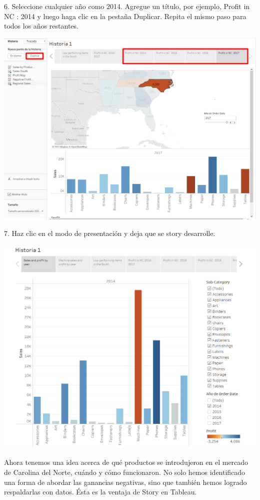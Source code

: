 \documentclass[12pt,letterpaper]{article}
\begin{document}
6. Seleccione cualquier año como 2014. Agregue un título, por ejemplo, Profit in NC :
2014 y luego haga clic en la pestaña Duplicar. Repita el mismo paso para todos los años
restantes.
\begin{center}
    \includegraphics[width=16cm]{img/70.png}  
\end{center}
7. Haz clic en el modo de presentación y deja que se story desarrolle.
\begin{center}
    \includegraphics[width=16cm]{img/71.png}  
\end{center}
Ahora tenemos una idea acerca de qué productos se introdujeron en el mercado de
Carolina del Norte, cuándo y cómo funcionaron. No solo hemos identificado una forma
de abordar las ganancias negativas, sino que también hemos logrado respaldarlas con
datos. Ésta es la ventaja de Story en Tableau.
\end{document}
